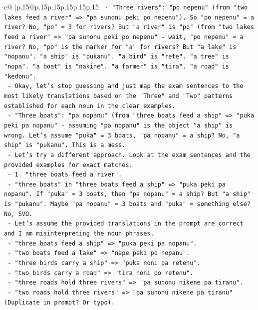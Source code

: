 \documentclass{article}
\begin{document}
{\begin{supertabular}{c@{$\;$}|p{.15\linewidth}@{}p{.15\linewidth}p{.15\linewidth}p{.15\linewidth}p{.15\linewidth}p{.15\linewidth}}
{{{\texttt{              {-} "Three rivers": "po nepenu" (from "two lakes feed a river" => "pa sunonu peki po nepenu"). So "po nepenu" = a river? No, "po" = 3 for rivers? But "a river" is "po" (from "two lakes feed a river" => "pa sunonu peki po nepenu" {-} wait, "po nepenu" = a river? No, "po" is the marker for "a" for rivers? But "a lake" is "nopanu". "a ship" is "pukanu". "a bird" is "rete". "a tree" is "nopa". "a boat" is "nakine". "a farmer" is "tira". "a road" is "kedonu".} \\
\texttt{              {-} Okay, let's stop guessing and just map the exam sentences to the most likely translations based on the "Three" and "Two" patterns established for each noun in the clear examples.} \\
\texttt{              {-} "Three boats": "pa nopanu" (from "three boats feed a ship" => "puka peki pa nopanu" {-} assuming "pa nopanu" is the object "a ship" is wrong. Let's assume "puka" = 3 boats, "pa nopanu" = a ship? No, "a ship" is "pukanu". This is a mess.} \\
\texttt{              {-} Let's try a different approach. Look at the exam sentences and the provided examples for exact matches.} \\
\texttt{              {-} 1. "three boats feed a river".} \\
\texttt{                 {-} "three boats" in "three boats feed a ship" => "puka peki pa nopanu". If "puka" = 3 boats, then "pa nopanu" = a ship? But "a ship" is "pukanu". Maybe "pa nopanu" = 3 boats and "puka" = something else? No, SVO.} \\
\texttt{                 {-} Let's assume the provided translations in the prompt are correct and I am misinterpreting the noun phrases.} \\
\texttt{                 {-} "three boats feed a ship" => "puka peki pa nopanu".} \\
\texttt{                 {-} "two boats feed a lake" => "nepe peki po nopanu".} \\
\texttt{                 {-} "three birds carry a ship" => "puka noni pa retenu".} \\
\texttt{                 {-} "two birds carry a road" => "tira noni po retenu".} \\
\texttt{                 {-} "three roads hold three rivers" => "pa sunonu nikene pa tiranu".} \\
\texttt{                 {-} "two roads hold three rivers" => "pa sunonu nikene pa tiranu" (Duplicate in prompt? Or typo).} \\
}}}
\end{supertabular}}
\end{document}
